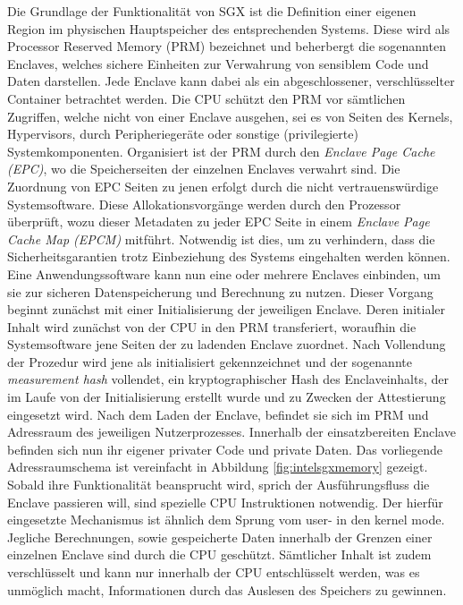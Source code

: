 Die Grundlage der Funktionalität von SGX ist die Definition einer eigenen Region im physischen Hauptspeicher des entsprechenden Systems. Diese wird als Processor Reserved Memory (PRM) bezeichnet und beherbergt die sogenannten Enclaves, welches sichere Einheiten zur Verwahrung von sensiblem Code und Daten darstellen. Jede Enclave kann dabei als ein abgeschlossener, verschlüsselter Container betrachtet werden. Die CPU schützt den PRM vor sämtlichen Zugriffen, welche nicht von einer Enclave ausgehen, sei es von Seiten des Kernels, Hypervisors, durch Peripheriegeräte oder sonstige (privilegierte) Systemkomponenten. Organisiert ist der PRM durch den \textit{Enclave Page Cache (EPC)}, wo die Speicherseiten der einzelnen Enclaves verwahrt sind. Die Zuordnung von EPC Seiten zu jenen erfolgt durch die nicht vertrauenswürdige Systemsoftware. Diese Allokationsvorgänge werden durch den Prozessor überprüft, wozu dieser Metadaten zu jeder EPC Seite in einem \textit{Enclave Page Cache Map (EPCM)} mitführt. Notwendig ist dies, um zu verhindern, dass die Sicherheitsgarantien trotz Einbeziehung des Systems eingehalten werden können. Eine Anwendungssoftware kann nun eine oder mehrere Enclaves einbinden, um sie zur sicheren Datenspeicherung und Berechnung zu nutzen. Dieser Vorgang beginnt zunächst mit einer Initialisierung der jeweiligen Enclave. Deren initialer Inhalt wird zunächst von der CPU in den PRM transferiert, woraufhin die Systemsoftware jene Seiten der zu ladenden Enclave zuordnet. Nach Vollendung der Prozedur wird jene als initialisiert gekennzeichnet und der sogenannte \textit{measurement hash} vollendet, ein kryptographischer Hash des Enclaveinhalts, der im Laufe von der Initialisierung erstellt wurde und zu Zwecken der Attestierung eingesetzt wird. Nach dem Laden der Enclave, befindet sie sich im PRM und Adressraum des jeweiligen Nutzerprozesses. Innerhalb der einsatzbereiten Enclave befinden sich nun ihr eigener privater Code und private Daten. Das vorliegende Adressraumschema ist vereinfacht in Abbildung \ref{fig:intelsgxmemory} gezeigt. Sobald ihre Funktionalität beansprucht wird, sprich der Ausführungsfluss die Enclave passieren will, sind spezielle CPU Instruktionen notwendig. Der hierfür eingesetzte Mechanismus ist ähnlich dem Sprung vom user- in den kernel mode. Jegliche Berechnungen, sowie gespeicherte Daten innerhalb der Grenzen einer einzelnen Enclave sind durch die CPU geschützt. Sämtlicher Inhalt ist zudem verschlüsselt und kann nur innerhalb der CPU entschlüsselt werden, was es unmöglich macht, Informationen durch das Auslesen des Speichers zu gewinnen.


